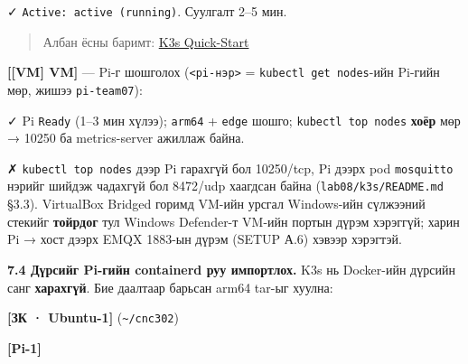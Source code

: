 ✓ \texttt{Active:\allowbreak{}\ active\ (running)}. Суулгалт 2--5 мин.

\begin{quote}
Албан ёсны баримт: \href{https://docs.k3s.io/quick-start}{K3s Quick-Start}
\end{quote}

\textbf{{[}{[}VM{]} VM{]}} --- Pi-г шошголох (\texttt{\textless{}pi-нэр\textgreater{}} = \texttt{kubectl\ get\ nodes}-ийн Pi-гийн мөр, жишээ \texttt{pi-team07}):

\begin{Shaded}
\begin{Highlighting}[]
\OperatorTok{\textless{}}\OperatorTok{\textgreater{}}
\end{Highlighting}
\end{Shaded}

✓ Pi \texttt{Ready} (1--3 мин хүлээ); \texttt{arm64} + \texttt{edge} шошго; \texttt{kubectl\ top\ nodes} \textbf{хоёр} мөр → 10250 ба metrics-server ажиллаж байна.

✗ \texttt{kubectl\ top\ nodes} дээр Pi гарахгүй бол 10250/tcp, Pi дээрх pod \texttt{mosquitto} нэрийг шийдэж чадахгүй бол 8472/udp хаагдсан байна (\texttt{lab08/\allowbreak{}k3s/\allowbreak{}README.\allowbreak{}md} §3.3). VirtualBox Bridged горимд VM-ийн урсгал Windows-ийн сүлжээний стекийг \textbf{тойрдог} тул Windows Defender-т VM-ийн портын дүрэм хэрэггүй; харин Pi → хост дээрх EMQX 1883-ын дүрэм (SETUP А.6) хэвээр хэрэгтэй.

\textbf{7.4 Дүрсийг Pi-гийн containerd руу импортлох.} K3s нь Docker-ийн дүрсийн санг \textbf{харахгүй}. Бие даалтаар барьсан arm64 tar-ыг хуулна:

\textbf{{[}ЗК · Ubuntu-1{]}} (\texttt{\textasciitilde{}/cnc302})

\begin{Shaded}
\begin{Highlighting}[]
\OperatorTok{\textless{}}\OperatorTok{\textgreater{}}
\end{Highlighting}
\end{Shaded}

\textbf{{[}Pi-1{]}}

